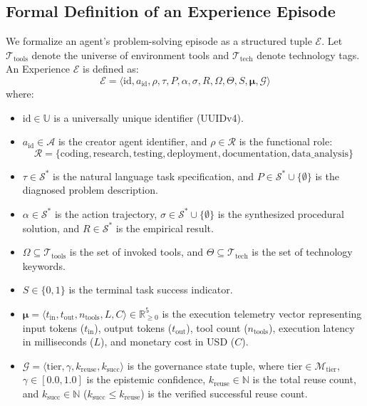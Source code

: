 \documentclass[lettersize,journal]{IEEEtran}
\begin{document}
\subsection{Formal Definition of an Experience Episode}
We formalize an agent's problem-solving episode as a structured tuple $\mathcal{E}$. Let $\mathcal{T}_{\text{tools}}$ denote the universe of environment tools and $\mathcal{T}_{\text{tech}}$ denote technology tags. An Experience $\mathcal{E}$ is defined as:
\begin{equation}
\label{eq:experience}
\mathcal{E} = \langle \text{id}, a_{\text{id}}, \rho, \tau, P, \alpha, \sigma, R, \Omega, \Theta, S, \boldsymbol{\mu}, \mathcal{G} \rangle
\end{equation}
where:
\begin{itemize}
    \item $\text{id} \in \mathbb{U}$ is a universally unique identifier (UUIDv4).
    \item $a_{\text{id}} \in \mathcal{A}$ is the creator agent identifier, and $\rho \in \mathcal{R}$ is the functional role:
    \begin{equation}
    \mathcal{R} = \{\text{coding}, \text{research}, \text{testing}, \text{deployment}, \text{documentation}, \text{data\_analysis}\}
    \end{equation}
    \item $\tau \in \mathcal{S}^*$ is the natural language task specification, and $P \in \mathcal{S}^* \cup \{\emptyset\}$ is the diagnosed problem description.
    \item $\alpha \in \mathcal{S}^*$ is the action trajectory, $\sigma \in \mathcal{S}^* \cup \{\emptyset\}$ is the synthesized procedural solution, and $R \in \mathcal{S}^*$ is the empirical result.
    \item $\Omega \subseteq \mathcal{T}_{\text{tools}}$ is the set of invoked tools, and $\Theta \subseteq \mathcal{T}_{\text{tech}}$ is the set of technology keywords.
    \item $S \in \{0, 1\}$ is the terminal task success indicator.
    \item $\boldsymbol{\mu} = \langle t_{\text{in}}, t_{\text{out}}, n_{\text{tools}}, L, C \rangle \in \mathbb{R}_{\ge 0}^5$ is the execution telemetry vector representing input tokens ($t_{\text{in}}$), output tokens ($t_{\text{out}}$), tool count ($n_{\text{tools}}$), execution latency in milliseconds ($L$), and monetary cost in USD ($C$).
    \item $\mathcal{G} = \langle \text{tier}, \gamma, k_{\text{reuse}}, k_{\text{succ}} \rangle$ is the governance state tuple, where $\text{tier} \in \mathcal{M}_{\text{tier}}$, $\gamma \in [0.0, 1.0]$ is the epistemic confidence, $k_{\text{reuse}} \in \mathbb{N}$ is the total reuse count, and $k_{\text{succ}} \in \mathbb{N}$ ($k_{\text{succ}} \le k_{\text{reuse}}$) is the verified successful reuse count.
\end{itemize}
\end{document}
